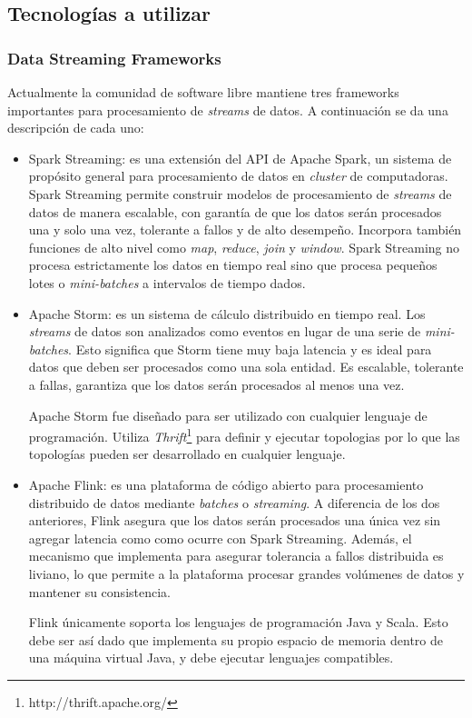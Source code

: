 \documentclass[a4paper,10pt, oneside]{article}
\begin{document}
\subsection*{Tecnologías a utilizar}
\subsubsection*{Data Streaming Frameworks}
Actualmente la comunidad de software libre mantiene tres frameworks importantes para procesamiento de \textit{streams} de datos. A continuación se da una descripción de cada uno:
\begin{itemize}
	\item Spark Streaming: es una extensión del API de Apache Spark, un sistema de propósito general para procesamiento de datos en \textit{cluster} de computadoras. Spark Streaming permite construir modelos de procesamiento de \textit{streams} de datos de manera escalable, con garantía de que los datos serán procesados una y solo una vez, tolerante a fallos y de alto desempeño. Incorpora también funciones de alto nivel como \textit{map}, \textit{reduce}, \textit{join} y \textit{window}. Spark Streaming no procesa estrictamente los datos en tiempo real sino que procesa pequeños lotes o \textit{mini-batches} a intervalos de tiempo dados.
	\item Apache Storm: es un sistema de cálculo distribuido en tiempo real. Los \textit{streams} de datos son analizados como eventos en lugar de una serie de \textit{mini-batches}. Esto significa que Storm tiene muy baja latencia y es ideal para datos que deben ser procesados como una sola entidad. Es escalable, tolerante a fallas, garantiza que los datos serán procesados al menos una vez.\par
	Apache Storm fue diseñado para ser utilizado con cualquier lenguaje de programación. Utiliza  \textit{Thrift}\footnote{http://thrift.apache.org/} para definir y ejecutar topologias por lo que las topologías pueden ser desarrollado en cualquier lenguaje.
	\item Apache Flink: es una plataforma de código abierto para procesamiento distribuido de datos mediante \textit{batches} o \textit{streaming}. A diferencia de los dos anteriores, Flink asegura que los datos serán procesados una única vez sin agregar latencia como como ocurre con Spark Streaming. Además, el mecanismo que implementa para asegurar tolerancia a fallos distribuida es liviano\cite{chandy1985distributed}, lo que permite a la plataforma procesar grandes volúmenes de datos y mantener su consistencia.
	\par Flink únicamente soporta los lenguajes de programación Java y Scala. Esto debe ser así dado que implementa su propio espacio de memoria dentro de una máquina virtual Java, y debe ejecutar lenguajes compatibles.	
\end{itemize}
\end{document}
